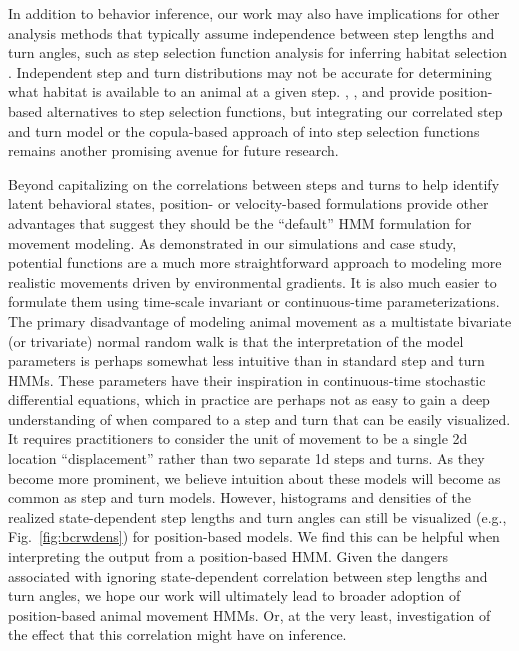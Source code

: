 \documentclass[12pt]{article}\usepackage[]{graphicx}\usepackage[]{xcolor}
\begin{document}
In addition to behavior inference, our work may also have implications for other analysis methods that typically assume independence between step lengths and turn angles, such as step selection function analysis for inferring habitat selection \citep[e.g.][]{thurfjell2014applications}. Independent step and turn distributions may not be accurate for determining what habitat is available to an animal at a given step. \citet{Johnson:2008kx}, \citet{Christ:2008fk}, and \cite{MichelotEtAl2019} provide position-based alternatives to step selection functions, but integrating our correlated step and turn model or the copula-based approach of \citet{hodel2022circular} into step selection functions remains another promising avenue for future research.

Beyond capitalizing on the correlations between steps and turns to help identify latent behavioral states, position- or velocity-based formulations provide other advantages that suggest they should be the ``default'' HMM formulation for movement modeling. As demonstrated in our simulations and case study, potential functions are a much more straightforward approach to modeling more realistic movements driven by environmental gradients. It is also much easier to formulate them using time-scale invariant or continuous-time parameterizations. The primary disadvantage of modeling animal movement as a multistate bivariate (or trivariate) normal random walk is that the interpretation of the model parameters is perhaps somewhat less intuitive than in standard step and turn HMMs. These parameters have their inspiration in continuous-time stochastic differential equations, which in practice are perhaps not as easy to gain a deep understanding of when compared to a step and turn that can be easily visualized. It requires practitioners to consider the unit of movement to be a single 2d location ``displacement'' rather than two separate 1d steps and turns. As they become more prominent, we believe intuition about these models will become as common as step and turn models. However, histograms and densities of the realized state-dependent step lengths and turn angles can still be visualized (e.g., Fig.\ \ref{fig:bcrwdens}) for position-based models. We find this can be helpful when interpreting the output from a position-based HMM. Given the dangers associated with ignoring state-dependent correlation between step lengths and turn angles, we hope our work will ultimately lead to broader adoption of position-based animal movement HMMs. Or, at the very least, investigation of the effect that this correlation might have on inference. 



\end{document}
